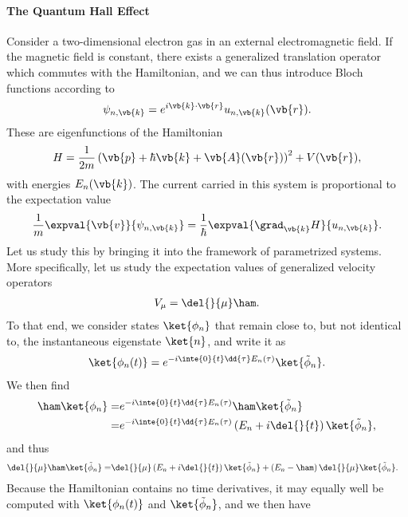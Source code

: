 \paragraph{The Quantum Hall Effect}
Consider a two-dimensional electron gas in an external electromagnetic field. If the magnetic field is constant, there exists a generalized translation operator which commutes with the Hamiltonian, and we can thus introduce Bloch functions according to
\begin{align*}
	\psi_{n, \vb{k}} = e^{i\vb{k}\cdot\vb{r}}u_{n, \vb{k}}(\vb{r}).
\end{align*}
These are eigenfunctions of the Hamiltonian
\begin{align*}
	H = \frac{1}{2m}\left(\vb{p} + \hbar\vb{k} + \vb{A}(\vb{r})\right)^{2} + V(\vb{r}),
\end{align*}
with energies $E_{n}(\vb{k})$. The current carried in this system is proportional to the expectation value
\begin{align*}
	\frac{1}{m}\expval{\vb{v}}{\psi_{n, \vb{k}}} = \frac{1}{\hbar}\expval{\grad_{\vb{k}}H}{u_{n, \vb{k}}}.
\end{align*}
Let us study this by bringing it into the framework of parametrized systems. More specifically, let us study the expectation values of generalized velocity operators
\begin{align*}
	V_{\mu} = \del{}{\mu}\ham.
\end{align*}
To that end, we consider states $\ket{\phi_{n}}$ that remain close to, but not identical to, the instantaneous eigenstate $\ket{n}$, and write it as
\begin{align*}
	\ket{\phi_{n}(t)} = e^{-i\inte{0}{t}\dd{\tau}E_{n}(\tau)}\ket{\tilde{\phi}_{n}}.
\end{align*}
We then find
\begin{align*}
	\ham\ket{\phi_{n}} =& e^{-i\inte{0}{t}\dd{\tau} E_{n}(\tau)}\ham\ket{\tilde{\phi}_{n}} \\
	=& e^{-i\inte{0}{t}\dd{\tau} E_{n}(\tau)}\left(E_{n} + i\del{}{t}\right)\ket{\tilde{\phi}_{n}},
\end{align*}
and thus
\begin{align*}
	\del{}{\mu}\ham\ket{\tilde{\phi}_{n}} =& \del{}{\mu}\left(E_{n} + i\del{}{t}\right)\ket{\tilde{\phi}_{n}} + \left(E_{n} - \ham\right)\del{}{\mu}\ket{\tilde{\phi}_{n}}.
\end{align*}
Because the Hamiltonian contains no time derivatives, it may equally well be computed with $\ket{\phi_{n}(t)}$ and $\ket{\tilde{\phi}_{n}}$, and we then have
